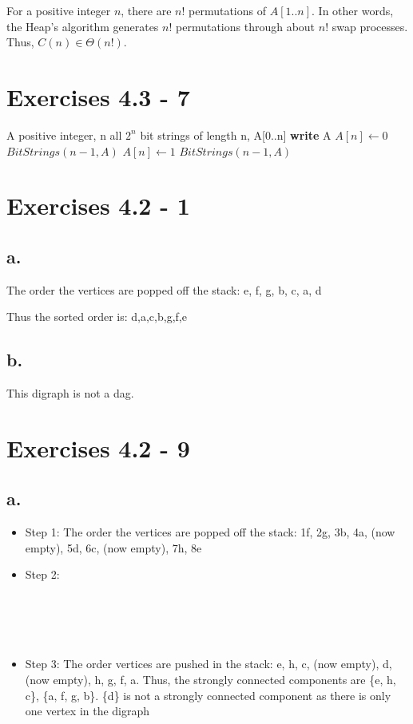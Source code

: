 \documentclass{article}
\begin{document}
For a positive integer $n$, there are $n!$ permutations of $A[1..n]$. In other words, the Heap's algorithm generates $n!$ permutations through about $n!$ swap processes. Thus, $C(n) \in \Theta(n!)$.

\section{Exercises 4.3 - 7}

\begin{center}
\begin{algorithmic}
\INPUT
A positive integer, n
\OUTPUT
all $2^n$ bit strings of length n, A[0..n]
\State \textbf{write} A
\EndIf
\State $A[n] \leftarrow 0$
\State $BitStrings(n-1,A)$
\State $A[n] \leftarrow 1$
\State $BitStrings(n-1,A)$
\EndFunction
\end{algorithmic}
\end{center}

\section{Exercises 4.2 - 1}

\subsection*{a.}

The order the vertices are popped off the stack: e, f, g, b, c, a, d

Thus the sorted order is: d,a,c,b,g,f,e

\subsection*{b.}

This digraph is not a dag.

\section{Exercises 4.2 - 9}

\subsection*{a.}

\begin{itemize}
\item Step 1: The order the vertices are popped off the stack: 1f, 2g, 3b, 4a, (now empty), 5d, 6c, (now empty), 7h, 8e
\item Step 2:\\ \\ \\ \\ \\
\item Step 3: The order vertices are pushed in the stack: e, h, c, (now empty), d, (now empty), h, g, f, a. Thus, the strongly connected components are \{e, h, c\}, \{a, f, g, b\}. \{d\} is not a strongly connected component as there is only one vertex in the digraph
\end{itemize}
\end{document}
